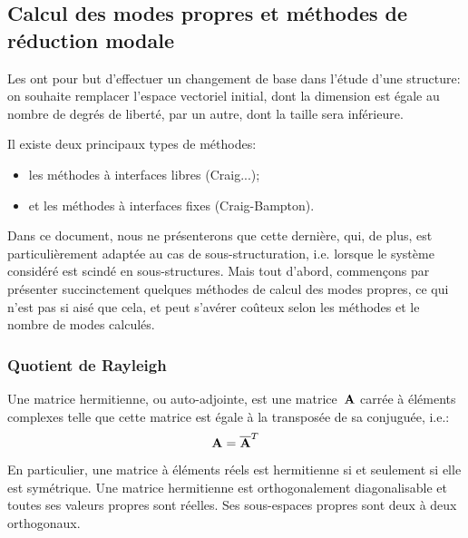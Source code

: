 \medskip
\subsection{Calcul des modes propres et méthodes de réduction modale}

Les  ont pour but d'effectuer un changement de base dans l'étude d'une structure: on souhaite remplacer l'espace vectoriel initial, dont la dimension est égale au nombre de degrés de liberté, par un autre, dont la taille sera inférieure.

\medskip
Il existe deux principaux types de méthodes:
\begin{itemize}
  \item les méthodes à interfaces libres (Craig...);
  \item et les méthodes à interfaces fixes (Craig-Bampton).
\end{itemize}
Dans ce document, nous ne présenterons que cette dernière, qui, de plus, est particulièrement adaptée au cas de sous-structuration, i.e. lorsque le système considéré est scindé en sous-structures.
\medskipvm
Mais tout d'abord, commençons par présenter succinctement quelques méthodes de calcul des modes propres, ce qui n'est pas si aisé que cela, et peut s'avérer coûteux selon les méthodes et le nombre de modes calculés.

\medskip
\ifVersionDuDocEstVincent\newpage\fi%
\subsubsection{Quotient de Rayleigh}

\begin{definition}
Une matrice hermitienne, ou auto-adjointe, est une matrice~$\MM{A}$ carrée à éléments complexes telle que cette matrice est égale à la transposée de sa conjuguée, i.e.:
\begin{equation}
\MM{A} = \overline{\MM{A}}^T
\end{equation}
\end{definition}
En particulier, une matrice à éléments réels est hermitienne si et seulement si elle est symétrique.
\medskipvm
Une matrice hermitienne est orthogonalement diagonalisable et toutes ses valeurs propres sont réelles. Ses sous-espaces propres sont deux à deux orthogonaux.


